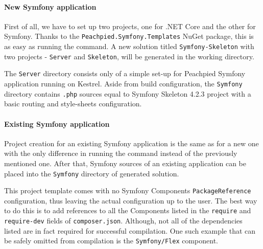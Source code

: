 \paragraph{New Symfony application} 
First of all, we have to set up two projects, one for .NET Core and the other for Symfony. Thanks to the \texttt{Peachpied.Symfony.Templates} NuGet package, this is as easy as running the \noindent{} command. A new solution titled \texttt{Symfony-Skeleton} with two projects - \texttt{Server} and \texttt{Skeleton}, will be generated in the working directory.

The \texttt{Server} directory consists only of a simple set-up for Peachpied Symfony application running on Kestrel. Aside from build configuration, the \texttt{Symfony} directory contains \texttt{.php} sources equal to Symfony Skeleton 4.2.3 project with a basic routing and style-sheets configuration.


\paragraph{Existing Symfony application}
Project creation for an existing Symfony application is the same as for a new one with the only difference in running the \noindent{} command instead of the previously mentioned one. After that, Symfony sources of an existing application can be placed into the \texttt{Symfony} directory of generated solution.

This project template comes with no Symfony Components \texttt{PackageReference} configuration, thus leaving the actual configuration up to the user. The best way to do this is to add references to all the Components listed in the \texttt{require} and \texttt{require-dev} fields of \texttt{composer.json}. Although, not all of the dependencies listed are in fact required for successful compilation. One such example that can be safely omitted from compilation is the \texttt{Symfony/Flex} component.


